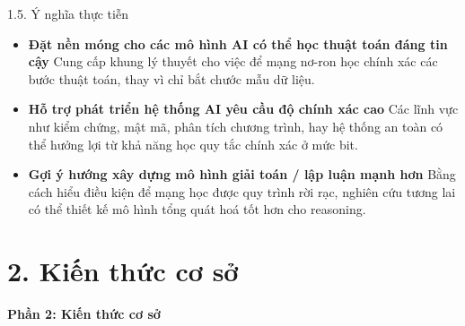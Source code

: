 \documentclass[10pt, aspectratio=169]{beamer}
\begin{document}
\begin{frame}{1.5. Ý nghĩa thực tiễn}

\begin{itemize}
    \item \textbf{Đặt nền móng cho các mô hình AI có thể học thuật toán đáng tin cậy}  
    Cung cấp khung lý thuyết cho việc để mạng nơ-ron học chính xác các bước thuật toán, thay vì chỉ bắt chước mẫu dữ liệu.

    \item \textbf{Hỗ trợ phát triển hệ thống AI yêu cầu độ chính xác cao}  
    Các lĩnh vực như kiểm chứng, mật mã, phân tích chương trình, hay hệ thống an toàn có thể hưởng lợi từ khả năng học quy tắc chính xác ở mức bit.

    \item \textbf{Gợi ý hướng xây dựng mô hình giải toán / lập luận mạnh hơn}  
    Bằng cách hiểu điều kiện để mạng học được quy trình rời rạc, nghiên cứu tương lai có thể thiết kế mô hình tổng quát hoá tốt hơn cho reasoning.

\end{itemize}

\end{frame}




\section{2. Kiến thức cơ sở}

\begin{frame}
    \centering
    \Huge \textbf{Phần 2: Kiến thức cơ sở}
\end{frame}
\end{document}
